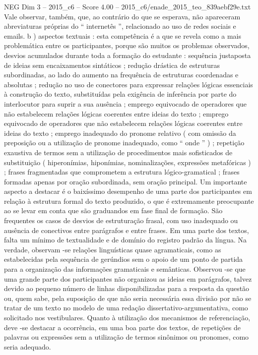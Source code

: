 \begin{textsample}{NEG Dim 3 – 2015\_c6 – Score 4.00 – 2015\_c6/enade\_2015\_teo\_839aebf29e.txt}
Vale observar, também, que, ao contrário do que se esperava, não apareceram abreviaturas próprias do “ internetês ”, relacionado ao uso de redes sociais e emails. b ) aspectos textuais : esta competência é a que se revela como a mais problemática entre os participantes, porque são muitos os problemas observados, desvios acumulados durante toda a formação do estudante : sequência justaposta de ideias sem encaixamentos sintáticos ; redução drástica de estruturas subordinadas, ao lado do aumento na frequência de estruturas coordenadas e absolutas ; redução no uso de conectores para expressar relações lógicas essenciais à construção do texto, substituídas pela exigência de inferência por parte do interlocutor para suprir a sua ausência ; emprego equivocado de operadores que não estabelecem relações lógicas coerentes entre ideias do texto ; emprego equivocado de operadores que não estabelecem relações lógicas coerentes entre ideias do texto ; emprego inadequado do pronome relativo ( com omissão da preposição ou a utilização de pronome inadequado, como “ onde ” ) ; repetição exaustiva de termos sem a utilização de procedimentos mais sofisticados de substituição ( hiperonímias, hiponímias, nominalizações, expressões metafóricas ) ; frases fragmentadas que comprometem a estrutura lógico-gramatical ; frases formadas apenas por oração subordinada, sem oração principal.
Um importante aspecto a destacar é o baixíssimo desempenho de uma parte dos participantes em relação à estrutura formal do texto produzido, o que é extremamente preocupante ao se levar em conta que são graduandos em fase final de formação.
São frequentes os casos de desvios de estruturação frasal, com uso inadequado ou ausência de conectivos entre parágrafos e entre frases.
Em uma parte dos textos, falta um mínimo de textualidade e de domínio do registro padrão da língua.
Na verdade, observam -se relações linguísticas quase agramaticais, como as estabelecidas pela sequência de gerúndios sem o apoio de um ponto de partida para a organização das informações gramaticais e semânticas.
Observou -se que uma grande parte dos participantes não organizou as ideias em parágrafos, talvez devido ao pequeno número de linhas disponibilizadas para a resposta da questão ou, quem sabe, pela suposição de que não seria necessária essa divisão por não se tratar de um texto no modelo de uma redação dissertativo-argumentativa, como solicitado nos vestibulares.
Quanto à utilização dos mecanismos de referenciação, deve -se destacar a ocorrência, em uma boa parte dos textos, de repetições de palavras ou expressões sem a utilização de termos sinônimos ou pronomes, como seria adequado.

\end{textsample}
